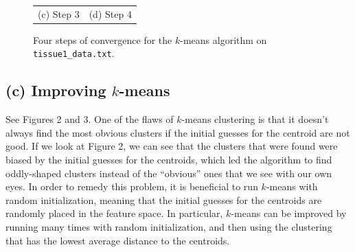 \documentclass[11pt]{article}
\begin{document}
\begin{figure}
\begin{tabular}{c c}
    (c) Step 3 & (d) Step 4 \\
\end{tabular}
\caption{Four steps of convergence for the $k$-means algorithm
on {\tt tissue1\_data.txt}.}
\end{figure}

\subsection*{(c) Improving $k$-means}
See Figures 2 and 3. One of the flaws of $k$-means clustering is
that it doesn't always find the most obvious clusters if the
initial guesses for the centroid are not good. If we look at
Figure 2, we can see that the clusters that were found were biased
by the initial guesses for the centroids, which led the algorithm
to find oddly-shaped clusters instead of the ``obvious'' ones that
we see with our own eyes. In order to remedy
this problem, it is beneficial to run $k$-means with random initialization,
meaning that the initial guesses for the centroids are randomly
placed in the feature space. In particular, $k$-means can be improved
by running many times with random initialization, and then using
the clustering that has the lowest average distance to the centroids.
\end{document}

